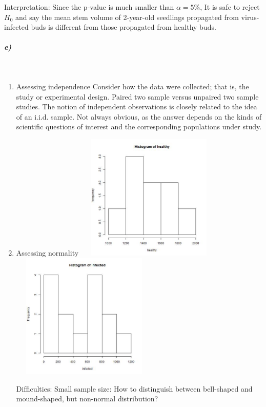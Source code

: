 \documentclass{article}
\begin{document}
Interpretation: Since the p-value is much smaller than $\alpha=5\%$, It is safe to reject $H_0$ and say the mean stem volume of 2-year-old seedlings propagated from virus-infected buds is diﬀerent from those propagated from healthy buds. 
\subparagraph{e)}~{}
\begin{enumerate}
\item Assessing independence
\subitem Consider how the data were collected; that is, the study or experimental design.
\subitem Paired two sample versus unpaired two sample studies.
\subitem The notion of independent observations is closely related to the idea of an i.i.d. sample.
\subitem Not always obvious, as the answer depends on the kinds of scientiﬁc questions of interest and the corresponding populations under study.
\item Assessing normality
\newline
\includegraphics[height=6cm,width=7cm]{healthy.jpg}
\includegraphics[height=6cm,width=7cm]{infected.jpg}

Difﬁculties:
\subitem Small sample size:
\subitem How to distinguish between bell-shaped and mound-shaped, but non-normal distribution?


\end{enumerate}
\end{document}
